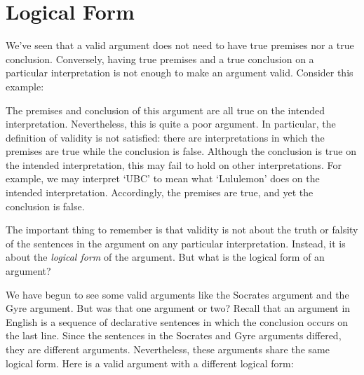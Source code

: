 



\section{Logical Form}
\label{sec:LogicalForm}

We've seen that a valid argument does not need to have true premises nor a true conclusion.
Conversely, having true premises and a true conclusion on a particular interpretation is not enough to make an argument valid.
Consider this example:

\begin{earg}
\end{earg}

The premises and conclusion of this argument are all true on the intended interpretation.
Nevertheless, this is quite a poor argument.
In particular, the definition of validity is not satisfied: there are interpretations in which the premises are true while the conclusion is false.
Although the conclusion is true on the intended interpretation, this may fail to hold on other interpretations.
For example, we may interpret `UBC' to mean what `Lululemon' does on the intended interpretation.
Accordingly, the premises are true, and yet the conclusion is false.

The important thing to remember is that validity is not about the truth or falsity of the sentences in the argument on any particular interpretation. 
Instead, it is about the \textit{logical form} of the argument.
But what is the logical form of an argument?

We have begun to see some valid arguments like the Socrates argument and the Gyre argument.
But was that one argument or two?
Recall that an argument in English is a sequence of declarative sentences in which the conclusion occurs on the last line.
Since the sentences in the Socrates and Gyre arguments differed, they are different arguments.
Nevertheless, these arguments share the same logical form.
Here is a valid argument with a different logical form:

\begin{earg}
\end{earg}


